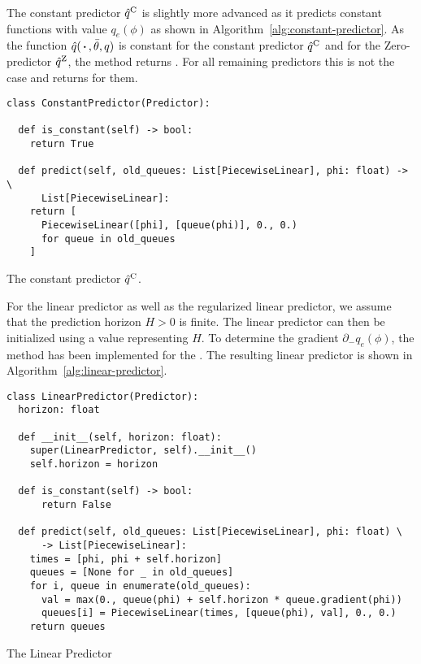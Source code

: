 The constant predictor $\hat q^{\text{C}}$ is slightly more advanced as it predicts constant functions with value $q_e(\phi)$ as shown in Algorithm~\ref{alg:constant-predictor}.
As the function $\hat q(\,\boldsymbol{\cdot}\,, \bar\theta, q)$ is constant for the constant predictor $\hat q^{\text{C}}$ and for the Zero-predictor $\hat q^{\text{Z}}$, the method  returns .
For all remaining predictors this is not the case and  returns  for them.

\begin{algorithm}[H]
  \begin{verbatim}
class ConstantPredictor(Predictor):

  def is_constant(self) -> bool:
    return True

  def predict(self, old_queues: List[PiecewiseLinear], phi: float) -> \
      List[PiecewiseLinear]:
    return [
      PiecewiseLinear([phi], [queue(phi)], 0., 0.)
      for queue in old_queues
    ]
\end{verbatim}
\caption{The constant predictor $\hat q^{\text{C}}$.}
\label{alg:constant-predictor}
\end{algorithm}

For the linear predictor as well as the regularized linear predictor, we assume that the prediction horizon $H>0$ is finite.
The linear predictor can then be initialized using a value \code{horizon} representing $H$.
To determine the gradient $\partial_-q_e(\phi)$, the method \code{gradient} has been implemented for the .
The resulting linear predictor is shown in Algorithm~\ref{alg:linear-predictor}.

\begin{algorithm}[H]
  \begin{verbatim}
class LinearPredictor(Predictor):
  horizon: float

  def __init__(self, horizon: float):
    super(LinearPredictor, self).__init__()
    self.horizon = horizon

  def is_constant(self) -> bool:
      return False

  def predict(self, old_queues: List[PiecewiseLinear], phi: float) \
      -> List[PiecewiseLinear]:
    times = [phi, phi + self.horizon]
    queues = [None for _ in old_queues]
    for i, queue in enumerate(old_queues):
      val = max(0., queue(phi) + self.horizon * queue.gradient(phi))
      queues[i] = PiecewiseLinear(times, [queue(phi), val], 0., 0.)
    return queues
  \end{verbatim}
  \caption{The Linear Predictor}
  \label{alg:linear-predictor}
\end{algorithm}

